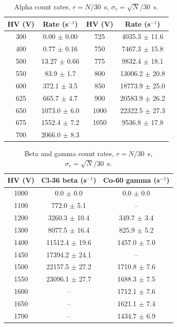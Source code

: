 \documentclass[12pt]{article}
\begin{document}
\begin{table}[!htbp]
\centering\small\setlength{\tabcolsep}{4pt}
\begin{tabular}{cc|cc}
\toprule
\textbf{HV (V)} & \textbf{Rate (s$^{-1}$)} & \textbf{HV (V)} & \textbf{Rate (s$^{-1}$)} \\
\midrule
300 & 0.00 $\pm$ 0.00 & 725 & 4035.3 $\pm$ 11.6 \\
400 & 0.77 $\pm$ 0.16 & 750 & 7467.3 $\pm$ 15.8 \\
500 & 13.27 $\pm$ 0.66 & 775 & 9832.4 $\pm$ 18.1 \\
550 & 83.9 $\pm$ 1.7 & 800 & 13006.2 $\pm$ 20.8 \\
600 & 372.1 $\pm$ 3.5 & 850 & 18773.9 $\pm$ 25.0 \\
625 & 665.7 $\pm$ 4.7 & 900 & 20583.9 $\pm$ 26.2 \\
650 & 1073.0 $\pm$ 6.0 & 1000 & 22322.5 $\pm$ 27.3 \\
675 & 1552.4 $\pm$ 7.2 & 1050 & 9536.8 $\pm$ 17.8 \\
700 & 2066.0 $\pm$ 8.3 & & \\
\bottomrule
\end{tabular}
\caption{Alpha count rates, $r = N/30$~s, $\sigma_r = \sqrt{N}/30$~s.}
\label{tab:appalpha}
\end{table}

\begin{table}[!htbp]
\centering\small
\begin{tabular}{ccc}
\toprule
\textbf{HV (V)} & \textbf{Cl-36 beta (s$^{-1}$)} & \textbf{Co-60 gamma (s$^{-1}$)} \\
\midrule
1000 & 0.0 $\pm$ 0.0 & 0.0 $\pm$ 0.0 \\
1100 & 772.0 $\pm$ 5.1 & -- \\
1200 & 3260.3 $\pm$ 10.4 & 349.7 $\pm$ 3.4 \\
1300 & 8077.5 $\pm$ 16.4 & 825.9 $\pm$ 5.2 \\
1400 & 11512.4 $\pm$ 19.6 & 1457.0 $\pm$ 7.0 \\
1450 & 17394.2 $\pm$ 24.1 & -- \\
1500 & 22157.5 $\pm$ 27.2 & 1710.8 $\pm$ 7.6 \\
1550 & 23096.1 $\pm$ 27.7 & 1688.3 $\pm$ 7.5 \\
1600 & -- & 1712.1 $\pm$ 7.6 \\
1650 & -- & 1621.1 $\pm$ 7.4 \\
1700 & -- & 1434.7 $\pm$ 6.9 \\
\bottomrule
\end{tabular}
\caption{Beta and gamma count rates, $r = N/30$~s, $\sigma_r = \sqrt{N}/30$~s.}
\label{tab:appbg}
\end{table}
\end{document}
